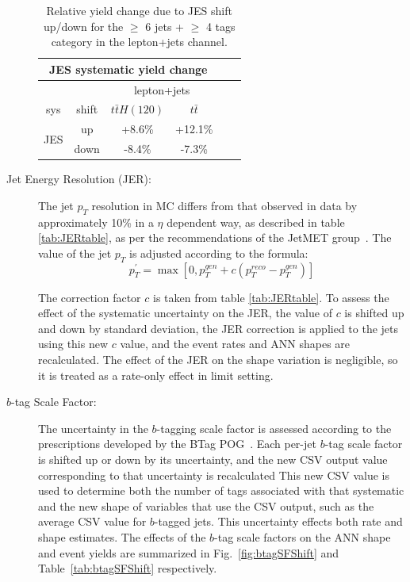 \begin{description}
\begin{table}[h] 
  \centering 
   \begin{tabular}{|c|c|c|c|c|c|} \hline 
\multicolumn{4}{|c|}{JES systematic yield change} \\ \hline
\multicolumn{2}{|c|}{ } & \multicolumn{2}{|c|}{lepton+jets} \\ \hline
sys & shift & $t\bar{t}H(120)$ & $t\bar{t}$  \\ \hline 
\multirow{2}{*}{JES} & up  & +8.6\% & +12.1\% \\
                     & down & -8.4\% & -7.3\% \\ \hline
  \end{tabular} 
  \caption{Relative yield change due to JES shift up/down for the
    $\ge$ 6 jets + $\ge$ 4 tags category in the
     lepton+jets channel.}
  \label{tab:JESShift}
\end{table} 

\item[Jet Energy Resolution (JER):]  The jet $p_T$ resolution in MC
  differs from that observed in data by approximately 10\% in a $\eta$
  dependent way, as described in table \ref{tab:JERtable}, as per the
  recommendations of the JetMET group~\cite{JERJetMET}.  The value of
  the jet $p_T$  is adjusted according to the formula:
\begin{equation}\label{eq:jer_formula}
p_T^{\prime} = \max{\left[0,p_T^{gen}+c(p_T^{reco}-p_T^{gen})\right]}
\end{equation}

  The correction factor $c$ is taken from table \ref{tab:JERtable}.  To
  assess the effect of the systematic uncertainty on the JER, the
  value of $c$ is shifted up and down by standard deviation, the JER
  correction is applied to the jets using this new $c$ value, and the
  event rates and ANN shapes are recalculated.  The effect of the JER
  on the shape variation is negligible, so it is treated as a
  rate-only effect in limit setting.  


\item[$b$-tag Scale Factor:] The uncertainty in the $b$-tagging
    scale factor is assessed according to the prescriptions developed
    by the BTag POG~\cite{btagSF}.  Each per-jet $b$-tag scale factor
    is shifted up or down by its uncertainty, and the new CSV output
    value corresponding to that uncertainty is recalculated  This new
    CSV value is used to determine both the number of tags associated with
    that systematic and the new shape of
    variables that use the CSV output, such as the average CSV value
    for $b$-tagged jets.  This uncertainty effects both rate and shape estimates.  
    The effects of the $b$-tag scale factors on the ANN shape and
    event yields are summarized in Fig.~\ref{fig:btagSFShift} and
    Table~\ref{tab:btagSFShift} respectively. 


\end{description}
